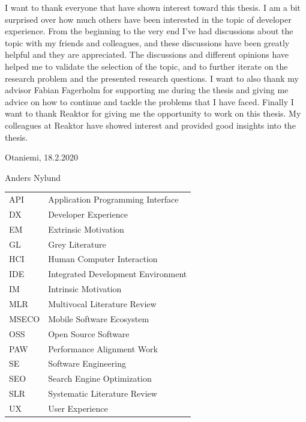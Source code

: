 \documentclass[english, 12pt, a4paper, sci, utf8, a-1b, online]{aaltothesis}
\newcommand{\datenow}{18.2.2020}
\begin{document}
I want to thank everyone that have shown interest toward this thesis.  I am a bit surprised over how much others have been interested in the topic of developer experience. From the beginning to the very end I've had discussions about the topic with my friends and colleagues, and these discussions have been greatly helpful and they are appreciated. The discussions and different opinions have helped me to validate the selection of the topic, and to further iterate on the research problem and the presented research questions. I want to also thank my advisor Fabian Fagerholm for supporting me during the thesis and giving me advice on how to continue and tackle the problems that I have faced. Finally I want to thank Reaktor for giving me the opportunity to work on this thesis. My colleagues at Reaktor have showed interest and provided good insights into the thesis.

\vspace{5cm}
Otaniemi, \datenow

\vspace{5mm}
{\hfill Anders Nylund \hspace{1cm}}

\newpage


\thesistableofcontents


\begin{tabular}{ll}
  API   & Application Programming Interface  \\
  DX    & Developer Experience               \\
  EM    & Extrinsic Motivation               \\
  GL    & Grey Literature                    \\
  HCI   & Human Computer Interaction         \\
  IDE   & Integrated Development Environment \\
  IM    & Intrinsic Motivation               \\
  MLR   & Multivocal Literature Review       \\
  MSECO & Mobile Software Ecosystem          \\
  OSS   & Open Source Software               \\
  PAW   & Performance Alignment Work         \\
  SE    & Software Engineering               \\
  SEO   & Search Engine Optimization         \\
  SLR   & Systematic Literature Review       \\
  UX    & User Experience                    \\
\end{tabular}
\end{document}
